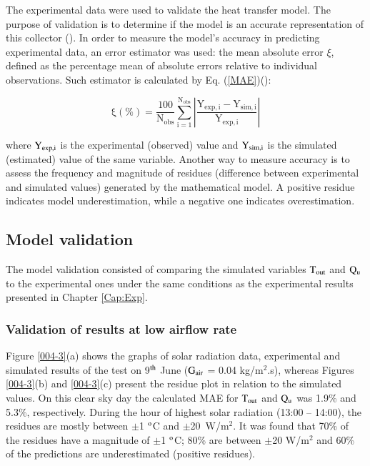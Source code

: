 The experimental data were used to validate the heat transfer model. The purpose of validation is to determine if the model is an accurate representation of this collector (\cite{Banks1987}). In order to measure the model's accuracy in predicting experimental data, an error estimator was used: the mean absolute error $\xi$, defined as the percentage mean of absolute errors relative to individual observations. Such estimator is calculated by Eq. (\ref{MAE})(\cite{Pujol-Nadal2015}):

\vspace{-0.75cm}
\begin{equation}
\mathrm{\xi(\% ) = \frac{{100}}{{{N_{obs}}}}\sum\limits_{i = 1}^{{N_{obs}}} {\left| {\frac{{{Y_{exp,i}} - {Y_{sim,i}}}}{{{Y_{exp,i}}}}} \right|} }
\label{MAE}
\end{equation}

\noindent where $\rm{Y_{exp,i}}$ is the experimental (observed) value and $\rm{Y_{sim,i}}$ is the simulated (estimated) value of the same variable. Another way to measure accuracy is to assess the frequency and magnitude of residues (difference between experimental and simulated values) generated by the mathematical model. A positive residue indicates model underestimation, while a negative one indicates overestimation.

\subsection{Model validation}

The model validation consisted of comparing the simulated variables $\rm{T_{out}}$ and $\rm{Q_{u}}$ to the experimental ones under the same conditions as the experimental results presented in Chapter \ref{Cap:Exp}.

\subsubsection{Validation of results at low airflow rate}

Figure \ref{004-3}(a) shows the graphs of solar radiation data, experimental and simulated results of the test on 9$^{\rm{th}}$ June ($\rm{G_{air}}$ = 0.04 kg/m$^2$.s), whereas Figures \ref{004-3}(b) and \ref{004-3}(c) present the residue plot in relation to the simulated values. On this clear sky day the calculated MAE for $\rm{T_{out}}$ and $\rm{Q_{u}}$ was 1.9\% and 5.3\%, respectively. During the hour of highest solar radiation (13:00 -- 14:00), the residues are mostly between $\pm$1 $^{\rm{o}}$C and $\pm$20~W/m$^2$. It was found that 70\% of the residues have a magnitude of $\pm$1 $^{\rm{o}}$C;  80\% are between $\pm$20 W/m$^2$ and 60\% of the predictions are underestimated (positive residues).

